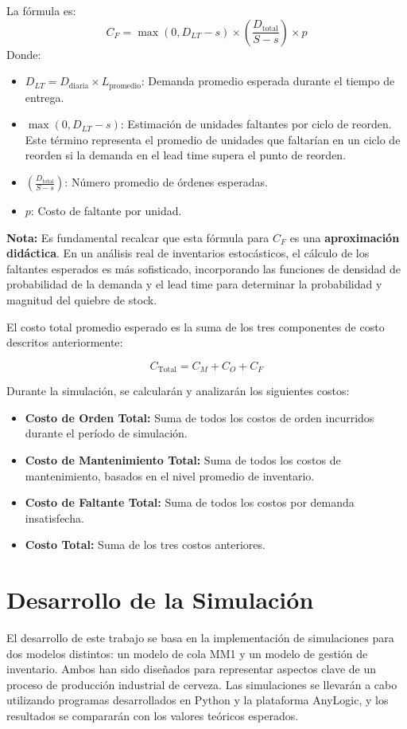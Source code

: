 \documentclass{article}
\begin{document}
La fórmula es:
$$C_F = \max(0, D_{LT} - s) \times \left( \frac{D_{\text{total}}}{S - s} \right) \times p$$
Donde:
\begin{itemize}
    \item $D_{LT} = D_{\text{diaria}} \times L_{\text{promedio}}$: Demanda promedio esperada durante el tiempo de entrega.
    \item $\max(0, D_{LT} - s)$: Estimación de unidades faltantes por ciclo de reorden. Este término representa el promedio de unidades que faltarían en un ciclo de reorden si la demanda en el lead time supera el punto de reorden.
    \item $\left( \frac{D_{\text{total}}}{S - s} \right)$: Número promedio de órdenes esperadas.
    \item $p$: Costo de faltante por unidad.
\end{itemize}
\textbf{Nota:} Es fundamental recalcar que esta fórmula para $C_F$ es una \textbf{aproximación didáctica}. En un análisis real de inventarios estocásticos, el cálculo de los faltantes esperados es más sofisticado, incorporando las funciones de densidad de probabilidad de la demanda y el lead time para determinar la probabilidad y magnitud del quiebre de stock.


El costo total promedio esperado es la suma de los tres componentes de costo descritos anteriormente:


$$C_{\text{Total}} = C_M + C_O + C_F$$




Durante la simulación, se calcularán y analizarán los siguientes costos:
\begin{itemize}
    \item \textbf{Costo de Orden Total:} Suma de todos los costos de orden incurridos durante el período de simulación.
    \item \textbf{Costo de Mantenimiento Total:} Suma de todos los costos de mantenimiento, basados en el nivel promedio de inventario.
    \item \textbf{Costo de Faltante Total:} Suma de todos los costos por demanda insatisfecha.
    \item \textbf{Costo Total:} Suma de los tres costos anteriores.
\end{itemize}


\section{Desarrollo de la Simulación}
El desarrollo de este trabajo se basa en la implementación de simulaciones para dos modelos distintos: un modelo de cola MM1 y un modelo de gestión de inventario. Ambos han sido diseñados para representar aspectos clave de un proceso de producción industrial de cerveza. Las simulaciones se llevarán a cabo utilizando programas desarrollados en Python y la plataforma AnyLogic, y los resultados se compararán con los valores teóricos esperados.
\end{document}
